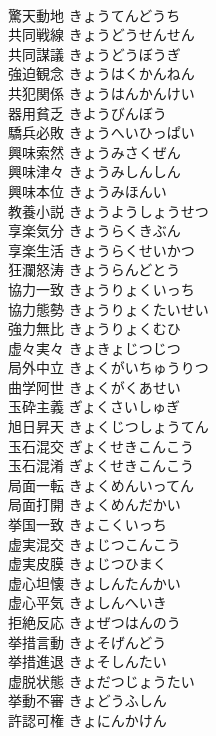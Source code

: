 \documentclass[8pt]{extreport}
\begin{document}
\begin{CJK}{UTF8}{min}
\\	驚天動地	きょうてんどうち	
\\	共同戦線	きょうどうせんせん	
\\	共同謀議	きょうどうぼうぎ	
\\	強迫観念	きょうはくかんねん	
\\	共犯関係	きょうはんかんけい	
\\	器用貧乏	きようびんぼう	
\\	驕兵必敗	きょうへいひっぱい	
\\	興味索然	きょうみさくぜん	
\\	興味津々	きょうみしんしん	
\\	興味本位	きょうみほんい	
\\	教養小説	きょうようしょうせつ	
\\	享楽気分	きょうらくきぶん	
\\	享楽生活	きょうらくせいかつ	
\\	狂瀾怒涛	きょうらんどとう	
\\	協力一致	きょうりょくいっち	
\\	協力態勢	きょうりょくたいせい	
\\	強力無比	きょうりょくむひ	
\\	虚々実々	きょきょじつじつ	
\\	局外中立	きょくがいちゅうりつ	
\\	曲学阿世	きょくがくあせい	
\\	玉砕主義	ぎょくさいしゅぎ	
\\	旭日昇天	きょくじつしょうてん	
\\	玉石混交	ぎょくせきこんこう	
\\	玉石混淆	ぎょくせきこんこう	
\\	局面一転	きょくめんいってん	
\\	局面打開	きょくめんだかい	
\\	挙国一致	きょこくいっち	
\\	虚実混交	きょじつこんこう	
\\	虚実皮膜	きょじつひまく	
\\	虚心坦懐	きょしんたんかい	
\\	虚心平気	きょしんへいき	
\\	拒絶反応	きょぜつはんのう	
\\	挙措言動	きょそげんどう	
\\	挙措進退	きょそしんたい	
\\	虚脱状態	きょだつじょうたい	
\\	挙動不審	きょどうふしん	
\\	許認可権	きょにんかけん	

\end{CJK}
\end{document}
